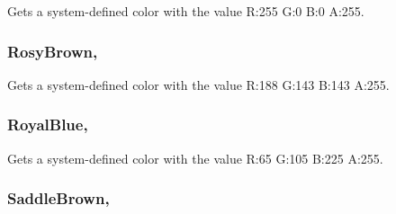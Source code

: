 Gets a system-\/defined color with the value R\+:255 G\+:0 B\+:0 A\+:255.

\hypertarget{structMicrosoft_1_1Xna_1_1Framework_1_1Color_af611d84fcfced58f4507f5fca5e63dd5}{}
\subsubsection[{Rosy\+Brown}]{ Rosy\+Brown\hspace{0.3cm}{\ttfamily [static]}, {\ttfamily [get]}}\label{structMicrosoft_1_1Xna_1_1Framework_1_1Color_af611d84fcfced58f4507f5fca5e63dd5}


Gets a system-\/defined color with the value R\+:188 G\+:143 B\+:143 A\+:255.

\hypertarget{structMicrosoft_1_1Xna_1_1Framework_1_1Color_af57939749aee65d23cd0827f841c6aa6}{}
\subsubsection[{Royal\+Blue}]{ Royal\+Blue\hspace{0.3cm}{\ttfamily [static]}, {\ttfamily [get]}}\label{structMicrosoft_1_1Xna_1_1Framework_1_1Color_af57939749aee65d23cd0827f841c6aa6}


Gets a system-\/defined color with the value R\+:65 G\+:105 B\+:225 A\+:255.

\hypertarget{structMicrosoft_1_1Xna_1_1Framework_1_1Color_a1afcc3741dd8cfdcaa6e5eed72b37eb4}{}
\subsubsection[{Saddle\+Brown}]{ Saddle\+Brown\hspace{0.3cm}{\ttfamily [static]}, {\ttfamily [get]}}\label{structMicrosoft_1_1Xna_1_1Framework_1_1Color_a1afcc3741dd8cfdcaa6e5eed72b37eb4}


